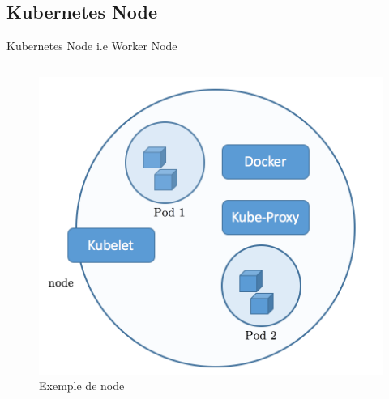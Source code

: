 \documentclass{bredelebeamer}
\begin{document}
\subsection{Kubernetes Node}
\begin{frame}{Kubernetes Node i.e Worker Node}
\begin{columns}
\begin{column}{0.3\textwidth}

\begin{figure}
\centering
\includegraphics[scale=0.2]{images/img23.png}
\caption{Exemple de node}
\end{figure}



\end{column}
\end{columns}
\end{frame}
\end{document}
